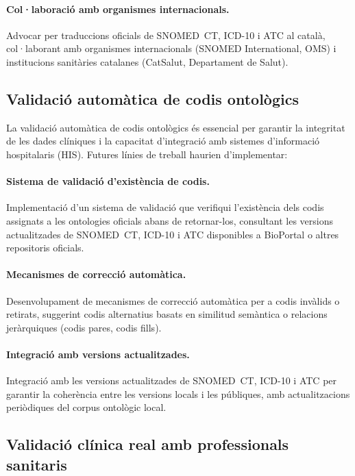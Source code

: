 \documentclass[CAT]{TFUOC}%
\begin{document}
\paragraph{Col·laboració amb organismes internacionals.}
Advocar per traduccions oficials de SNOMED~CT, ICD-10 i ATC al català, col·laborant amb organismes internacionals (SNOMED International, OMS) i institucions sanitàries catalanes (CatSalut, Departament de Salut).

\subsection{Validació automàtica de codis ontològics}

La validació automàtica de codis ontològics és essencial per garantir la integritat de les dades clíniques i la capacitat d'integració amb sistemes d'informació hospitalaris (HIS). Futures línies de treball haurien d'implementar:

\paragraph{Sistema de validació d'existència de codis.}
Implementació d'un sistema de validació que verifiqui l'existència dels codis assignats a les ontologies oficials abans de retornar-los, consultant les versions actualitzades de SNOMED~CT, ICD-10 i ATC disponibles a BioPortal o altres repositoris oficials.

\paragraph{Mecanismes de correcció automàtica.}
Desenvolupament de mecanismes de correcció automàtica per a codis invàlids o retirats, suggerint codis alternatius basats en similitud semàntica o relacions jeràrquiques (codis pares, codis fills).

\paragraph{Integració amb versions actualitzades.}
Integració amb les versions actualitzades de SNOMED~CT, ICD-10 i ATC per garantir la coherència entre les versions locals i les públiques, amb actualitzacions periòdiques del corpus ontològic local.

\subsection{Validació clínica real amb professionals sanitaris}
\end{document}
